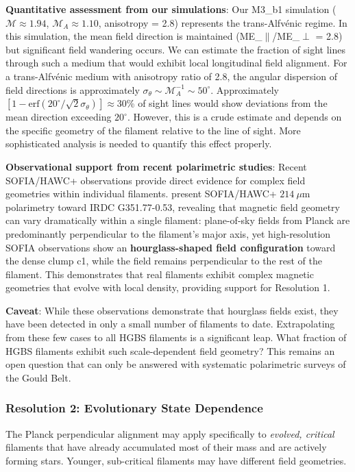 \documentclass[11pt,a4paper]{article}
\begin{document}
\textbf{Quantitative assessment from our simulations}: Our M3\_b1 simulation ($\mathcal{M} \approx 1.94$, $\mathcal{M}_A \approx 1.10$, anisotropy = 2.8) represents the trans-Alfv\'enic regime. In this simulation, the mean field direction is maintained (ME\_$\parallel$/ME\_$\perp$ = 2.8) but significant field wandering occurs. We can estimate the fraction of sight lines through such a medium that would exhibit local longitudinal field alignment. For a trans-Alfv\'enic medium with anisotropy ratio of 2.8, the angular dispersion of field directions is approximately $\sigma_\theta \sim \mathcal{M}_A^{-1} \sim 50^\circ$. Approximately $[1 - \text{erf}(20^\circ/\sqrt{2}\sigma_\theta)] \approx 30$\% of sight lines would show deviations from the mean direction exceeding $20^\circ$. However, this is a crude estimate and depends on the specific geometry of the filament relative to the line of sight. More sophisticated analysis is needed to quantify this effect properly.

\textbf{Observational support from recent polarimetric studies}: Recent SOFIA/HAWC+ observations provide direct evidence for complex field geometries within individual filaments. \citet{Jadhav2026} present SOFIA/HAWC+ $214~\mu$m polarimetry toward IRDC G351.77-0.53, revealing that magnetic field geometry can vary dramatically within a single filament: plane-of-sky fields from Planck are predominantly perpendicular to the filament's major axis, yet high-resolution SOFIA observations show an \textbf{hourglass-shaped field configuration} toward the dense clump c1, while the field remains perpendicular to the rest of the filament. This demonstrates that real filaments exhibit complex magnetic geometries that evolve with local density, providing support for Resolution 1.

\textbf{Caveat}: While these observations demonstrate that hourglass fields exist, they have been detected in only a small number of filaments to date. Extrapolating from these few cases to all HGBS filaments is a significant leap. What fraction of HGBS filaments exhibit such scale-dependent field geometry? This remains an open question that can only be answered with systematic polarimetric surveys of the Gould Belt.

\subsubsection{Resolution 2: Evolutionary State Dependence}

The Planck perpendicular alignment may apply specifically to \emph{evolved, critical} filaments that have already accumulated most of their mass and are actively forming stars. Younger, sub-critical filaments may have different field geometries.
\end{document}

